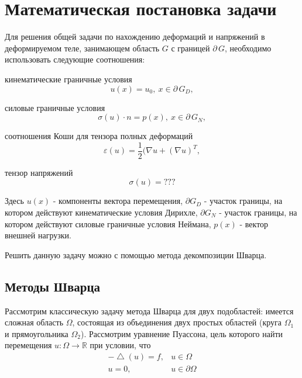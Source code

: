 \documentclass[a4paper]{article}
\begin{document}
 
\section{Математическая постановка задачи}

Для решения общей задачи по нахождению деформаций и напряжений в деформируемом теле, занимающем область $G$ с границей $\partial \, G$, необходимо использовать следующие соотношения:

кинематические граничные условия
\begin{equation}
u(x) = u_0, \ x \in \partial \, G_D,
\end{equation}

силовые граничные условия
\begin{equation}
\sigma(u) \cdot n = p(x), \ x \in \partial \, G_N,
\end{equation}

соотношения Коши для тензора полных деформаций
\begin{equation}
\varepsilon(u)=\dfrac{1}{2}(\nabla u + (\nabla u)^T,
\end{equation}

тензор напряжений
\begin{equation}
\sigma(u)=???
\end{equation}

Здесь $u(x)$ - компоненты вектора перемещения, $\partial G_D$ - участок границы, на котором действуют кинематические условия Дирихле, $\partial G_N$ - участок границы, на котором действуют силовые граничные условия Неймана, $p(x)$ - вектор внешней нагрузки. 

Решить данную задачу можно с помощью метода декомпозиции Шварца.

\subsection{Методы Шварца}
Рассмотрим классическую задачу метода Шварца для двух подобластей: имеется сложная область $\Omega$, состоящая из объединения двух простых областей (круга $\Omega_1$ и прямоугольника $\Omega_2$). Рассмотрим уравнение Пуассона, цель которого найти перемещения $u: \Omega \rightarrow \mathbb{R}$ при условии, что
\begin{equation*}
\begin{array}{rl}
-\bigtriangleup \!(u) = f, & u \in \Omega \\
u = 0, & u \in \partial \Omega
\end{array}
\end{equation*}
\end{document}
